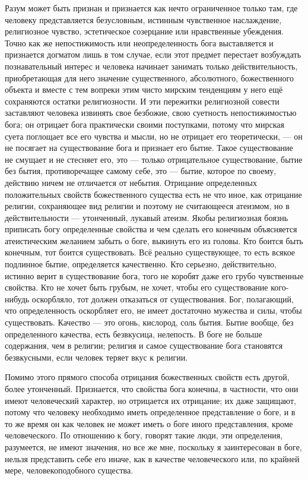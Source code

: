 \documentclass[12pt,oneside]{book}
\begin{document}
Разум может быть признан и признается как нечто ограниченное только там, где человеку представляется безусловным, истинным чувственное наслаждение, религиозное чувство, эстетическое созерцание или нравственные убеждения. Точно как же непостижимость или неопределенность бога выставляется и признается догматом лишь в том случае, если этот предмет перестает возбуждать познавательный интерес и человека начинает занимать только действительность, приобретающая для него значение существенного, абсолютного, божественного объекта и вместе с тем вопреки этим чисто мирским тенденциям у него ещё сохраняются остатки религиозности. И эти пережитки религиозной совести заставляют человека извинять свое безбожие, свою суетность непостижимостью бога; он отрицает бога практически своими поступками, потому что мирская суета поглощает все его чувства и мысли, но не отрицает его теоретически, --- он не посягает на существование бога и признает его бытие. Такое существование не смущает и не стесняет его, это --- только отрицательное существование, бытие без бытия, противоречащее самому себе, это --- бытие, которое по своему, действию ничем не отличается от небытия. Отрицание определенных положительных свойств божественного существа есть не что иное, как отрицание религии, сохраняющее вид религии и поэтому не считающееся атеизмом, но в действительности --- утонченный, лукавый атеизм. Якобы религиозная боязнь приписать богу определенные свойства и чем сделать его конечным объясняется атеистическим желанием забыть о боге, выкинуть его из головы. Кто боится быть конечным, тот боится существовать. Всё реально существующее, то есть всякое подлинное бытие, определяется качественно. Кто серьезно, действительно, истинно верит в существование бога, того не коробят даже его грубо чувственные свойства. Кто не хочет быть грубым, не хочет, чтобы его существование кого-нибудь оскорбляло, тот должен отказаться от существования. Бог, полагающий, что определенность оскорбляет его, не имеет достаточно мужества и силы, чтобы существовать. Качество --- это огонь, кислород, соль бытия. Бытие вообще, без определенного качества, есть безвкусица, нелепость. В боге не больше содержания, чем в религии; религия и самое существование бога становятся безвкусными, если человек теряет вкус к религии.

Помимо этого прямого способа отрицания божественных свойств есть другой, более утонченный. Признается, что свойства бога конечны, в частности, что они имеют человеческий характер, но отрицается их отрицание; их даже защищают, потому что человеку необходимо иметь определенное представление о боге, и в то же время он как человек не может иметь о боге иного представления, кроме человеческого. По отношению к богу, говорят такие люди, эти определения, разумеется, не имеют значения, но все же мне, поскольку я заинтересован в боге, нельзя представить себе его иначе, как в качестве человеческого или, по крайней мере, человекоподобного существа.
\end{document}
